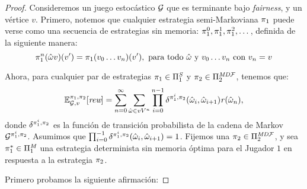 \begin{proof}
  Consideremos un juego estocástico $\mathcal{G}$ que es terminante bajo \textit{fairness}, y un vértice $v$. Primero, notemos que cualquier estrategia semi-Markoviana $\pi_{1}$ puede verse como una secuencia de estrategias sin memoria: $\pi_{1}^{0},\pi_{1}^{1},\pi_{1}^{2}, \dots$,  definida de la siguiente manera:
  \begin{equation}\label{eq:def-memoryless-strat-for-semimarkov}
    \pi_{1}^{n}(\hat{\omega}v)(v') = \pi_{1}(v_0 \dots v_n)(v'), \text{ para todo $\hat{\omega}$ y $v_0 \dots v_n$ con $v_n = v$}
  \end{equation}

  Ahora,  para cualquier par de estrategias $\pi_{1} \in \Pi^{\textit{S}}_{1}$ y $\pi_{2} \in \Pi^{\textit{MD}\mathcal{F}}_{2}$, tenemos que:
  \[
  \mathbb{E}^{\pi_{1}, \pi_{2}}_{\mathcal{G},v}[\textit{rew}] = 
  \sum^\infty_{n=0} \sum_{\hat{\omega} \in vV^n} \prod^{n-1}_{i=0} \delta^{\pi_{1}^i,\pi_{2}}(\hat{\omega}_i, \hat{\omega}_{i+1}) \mathit{r}(\hat{\omega}_n),
  \]
  donde $\delta^{\pi_{1}^i,\pi_{2}}$ es la función de transición probabilista de la cadena de Markov $\mathcal{G}^{\pi_{1}^i,\pi_{2}}$.  Asumimos que $\prod^{-1}_{i=0} \delta^{\pi_{1}^i,\pi_{2}}(\hat{\omega}_i, \hat{\omega}_{i+1}) = 1$.
%
  Fijemos una $\pi_{2} \in \Pi^{\textit{MD}\mathcal{F}}_{2}$, y sea $\pi^*_{1} \in \Pi^{\textit{M}}_{1}$ una estrategia determinista sin memoria óptima para el Jugador $1$  en respuesta a la estrategia $\pi_{2}$.

  Primero probamos la siguiente afirmación:


\end{proof}
